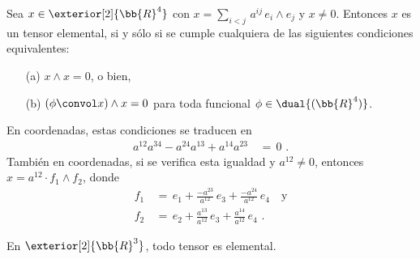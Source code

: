 \begin{teoEquivalenciasTensoresElementalesRCuatro}%
	\label{thm:equivtensoreselementalesrcuatro}
	Sea $x\in\exterior[2]{\bb{R}^{4}}$ con $x=\sum_{i<j}\,
	a^{ij}\,e_{i}\wedge e_{j}$ y $x\not =0$. Entonces $x$ es un
	tensor elemental, si y s\'{o}lo si se cumple cualquiera de las
	siguientes condiciones equivalentes:
	\begin{itemize}
		\item[(a)] $x\wedge x=0$, o bien,
		\item[(b)] $(\phi\convol x)\wedge x=0$ para toda funcional
			$\phi\in\dual{(\bb{R}^{4})}$.
	\end{itemize}
	En coordenadas, estas condiciones se traducen en
	\begin{align*}
		a^{12}a^{34}-a^{24}a^{13}+a^{14}a^{23} & \,=\,0
		\text{ .}
	\end{align*}
	Tambi\'{e}n en coordenadas, si se verifica esta igualdad y
	$a^{12}\not =0$, entonces $x=a^{12}\cdot f_{1}\wedge f_{2}$, donde
	\begin{align*}
		f_{1} & \,=\,e_{1}+\frac{-a^{23}}{a^{12}}\,e_{3}+
			\frac{-a^{24}}{a^{12}}\,e_{4}
		\quad\text{y} \\
		f_{2} & \,=\,e_{2}+\frac{a^{13}}{a^{12}}\,e_{3}+
			\frac{a^{14}}{a^{12}}\,e_{4}
		\text{ .}
	\end{align*}
\end{teoEquivalenciasTensoresElementalesRCuatro}

\begin{coroTensoresElementalesRTres}%
	\label{thm:tensoreselementalesrtres}
	En $\exterior[2]{\bb{R}^{3}}$, todo tensor es elemental.
\end{coroTensoresElementalesRTres}

